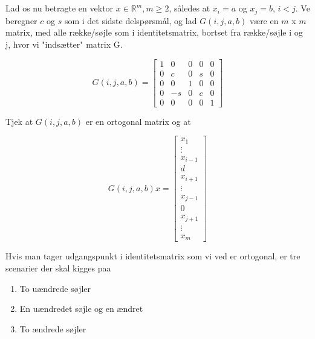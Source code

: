 \documentclass{article}
\begin{document}
\subsection{}
Lad os nu betragte en vektor $x \in \mathbb{R}^m, m\geq 2$, s\aa ledes at $x_i=a$ og $x_j = b$, $i < j$. Ve beregner $c$ og $s$ som i det sidste delsp\o rsm\aa l, og lad $G(i,j,a,b)$ v\ae re en $m$ x $m$ matrix, med alle r\ae kke/s\o jle som i identitetsmatrix, bortset fra r\ae kke/s\o jle i og j, hvor vi "inds\ae tter" matrix G.

\begin{equation}
    G(i,j,a,b) =
    \begin{bmatrix}
        1 & 0 & 0 & 0 & 0 \\
        0 & c & 0 & s & 0 \\
        0 & 0 & 1 & 0 & 0 \\
        0 & -s& 0 & c & 0 \\
        0 & 0 & 0 & 0 & 1
    \end{bmatrix}
\end{equation}

Tjek at $G(i,j,a,b)$ er en ortogonal matrix og at

\begin{equation}
    G(i,j,a,b)x =
    \begin{bmatrix}
        x_1 \\
        \vdots \\
        x_{i-1} \\
        d \\
        x_{i+1} \\
        \vdots \\
        x_{j-1} \\
        0 \\
        x_{j+1} \\
        \vdots \\
        x_m
    \end{bmatrix}
\end{equation}

Hvis man tager udgangspunkt i identitetsmatrix som vi ved er ortogonal, er tre scenarier der skal kigges paa

\begin{enumerate}
    \item To u\ae ndrede s\o jler
    \item En u\ae ndredet s\o jle og en \ae ndret
    \item To \ae ndrede s\o jler
\end{enumerate}
\end{document}
